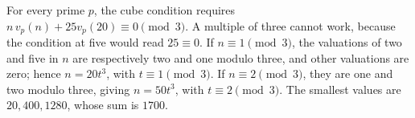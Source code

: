 For every prime $p$, the cube condition requires $n\,v_p(n)+25v_p(20)\equiv0\pmod3$. A multiple of three cannot work, because the condition at five would read $25\equiv0$. If $n\equiv1\pmod3$, the valuations of two and five in $n$ are respectively two and one modulo three, and other valuations are zero; hence $n=20t^3$, with $t\equiv1\pmod3$. If $n\equiv2\pmod3$, they are one and two modulo three, giving $n=50t^3$, with $t\equiv2\pmod3$. The smallest values are $20,400,1280$, whose sum is $\boxed{1700}$.
